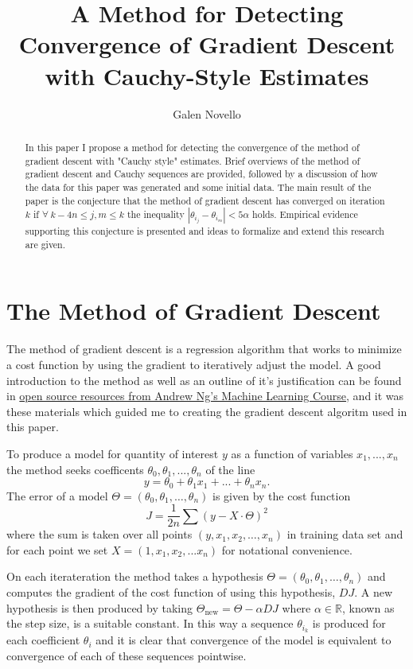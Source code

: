 \documentclass[11pt]{article} %
\title{A Method for Detecting Convergence of Gradient Descent with Cauchy-Style Estimates}
\author{Galen Novello}
\begin{document}
\maketitle

\begin{abstract}
In this paper I propose a method for detecting the convergence of the method of gradient descent with "Cauchy 
style" estimates.  Brief overviews of the method of gradient descent and Cauchy sequences are provided, followed by a discussion
of how the data for this paper was generated and some initial data.  The main result of the paper is the conjecture that the method of gradient descent has converged on iteration $k$ if 
$\forall\ k - 4n \leq  j,m \leq k$ the inequality $|\theta_{i_{j}} - \theta_{i_{m}}| < 5\alpha$ holds. Empirical evidence supporting this conjecture is presented and ideas to formalize and extend this research are given.
\end{abstract}

\section{The Method of Gradient Descent}
The method of gradient descent is a regression algorithm that works to minimize a cost function by using 
the gradient to iteratively adjust the model. A good introduction to the method as well as an outline of it's justification 
can be found in \href{http://openclassroom.stanford.edu/MainFolder/CoursePage.php?course=MachineLearning}{open source resources from Andrew Ng's Machine Learning Course}, 
and it was these materials which guided me to creating the gradient descent algoritm used in this paper. 

To produce a model for quantity of interest $y$  as a function of variables 
$x_{1}, ... , x_{n}$ the method seeks coefficents $\theta_{0}, \theta_{1}, ... , \theta_{n}$ of the line 
$$y = \theta_{0} + \theta_{1} x_{1} + ... + \theta_{n} x_{n}.$$  
The error of a model $\Theta = (\theta_{0}, \theta_{1}, \dots , \theta_{n})$ 
is given by the cost function 
$$J = \frac{1}{2n} \sum (y - X \cdot \Theta)^{2}$$ where the sum is taken over all points 
$(y, x_{1}, x_{2}, \dots , x_{n})$  in training data set and for each point we set $X = (1, x_{1}, x_{2}, ... x_{n})$
for notational convenience. 


On each iterateration the method takes a hypothesis $\Theta = (\theta_{0}, \theta_{1}, \dots , \theta_{n})$ 
and computes the gradient of the cost function of using this hypothesis, $DJ$.
A new hypothesis is then produced by taking $\Theta_{\mbox{new}} = \Theta - \alpha DJ$ where $\alpha \in \mathbb{R}$, known as
the step size, is a suitable constant. In this way a sequence $\theta_{i_{k}}$ is produced for each coefficient $\theta_{i}$ and it is clear that
convergence of the model is equivalent to convergence of each of these sequences pointwise. 
\end{document}
